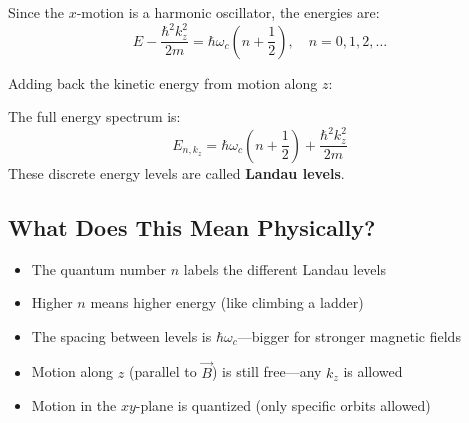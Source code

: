\documentclass[11pt,a4paper]{article}
\let\oldsubsection\subsection
\renewcommand{\subsection}{\needspace{4\baselineskip}\oldsubsection}
\theoremstyle{definition}
\theoremstyle{remark}
\begin{document}
Since the $x$-motion is a harmonic oscillator, the energies are:
\begin{equation}
    E - \frac{\hbar^2 k_z^2}{2m} = \hbar\omega_c\left(n + \frac{1}{2}\right), \quad n = 0, 1, 2, \ldots
\end{equation}

Adding back the kinetic energy from motion along $z$:
\begin{keyresult}
The full energy spectrum is:
\begin{equation}
    \boxed{E_{n, k_z} = \hbar\omega_c\left(n + \frac{1}{2}\right) + \frac{\hbar^2 k_z^2}{2m}}
\end{equation}
These discrete energy levels are called \textbf{Landau levels}.
\end{keyresult}

\begin{center}
\end{center}

\subsection{What Does This Mean Physically?}

\begin{insight}
\begin{itemize}
    \item The quantum number $n$ labels the different Landau levels
    \item Higher $n$ means higher energy (like climbing a ladder)
    \item The spacing between levels is $\hbar\omega_c$---bigger for stronger magnetic fields
    \item Motion along $z$ (parallel to $\vec{B}$) is still free---any $k_z$ is allowed
    \item Motion in the $xy$-plane is quantized (only specific orbits allowed)
\end{itemize}
\end{insight}
\end{document}
